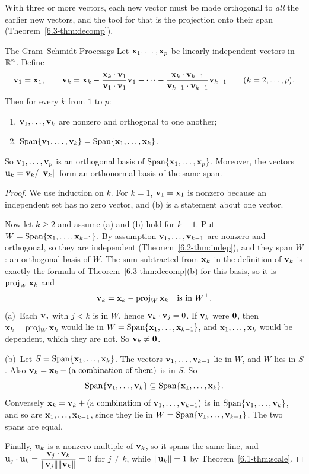 \documentclass[11pt]{article}
\begin{document}
With three or more vectors, each new vector must be made orthogonal to \emph{all} the earlier new vectors, and the tool for that is the projection onto their span (Theorem~\ref{6.3-thm:decomp}).

\begin{thm}{The Gram--Schmidt Process}{gs}
Let $\mathbf{x}_1,\dots,\mathbf{x}_p$ be linearly independent vectors in $\mathbb{R}^n$. Define
\[
\mathbf{v}_1=\mathbf{x}_1,\qquad \mathbf{v}_k=\mathbf{x}_k-\frac{\mathbf{x}_k\cdot\mathbf{v}_1}{\mathbf{v}_1\cdot\mathbf{v}_1}\mathbf{v}_1-\cdots-\frac{\mathbf{x}_k\cdot\mathbf{v}_{k-1}}{\mathbf{v}_{k-1}\cdot\mathbf{v}_{k-1}}\mathbf{v}_{k-1}\qquad(k=2,\dots,p).
\]
Then for every $k$ from $1$ to $p$:
\begin{enumerate}[label=(\alph*),itemsep=1pt]
  \item $\mathbf{v}_1,\dots,\mathbf{v}_k$ are nonzero and orthogonal to one another;
  \item $\operatorname{Span}\{\mathbf{v}_1,\dots,\mathbf{v}_k\}=\operatorname{Span}\{\mathbf{x}_1,\dots,\mathbf{x}_k\}$.
\end{enumerate}
So $\mathbf{v}_1,\dots,\mathbf{v}_p$ is an orthogonal basis of $\operatorname{Span}\{\mathbf{x}_1,\dots,\mathbf{x}_p\}$. Moreover, the vectors $\mathbf{u}_k=\mathbf{v}_k/\lVert\mathbf{v}_k\rVert$ form an orthonormal basis of the same span.
\end{thm}

\begin{proof}
We use induction on $k$. For $k=1$, $\mathbf{v}_1=\mathbf{x}_1$ is nonzero because an independent set has no zero vector, and (b) is a statement about one vector.

Now let $k\ge2$ and assume (a) and (b) hold for $k-1$. Put $W=\operatorname{Span}\{\mathbf{x}_1,\dots,\mathbf{x}_{k-1}\}$. By assumption $\mathbf{v}_1,\dots,\mathbf{v}_{k-1}$ are nonzero and orthogonal, so they are independent (Theorem~\ref{6.2-thm:indep}), and they span $W$: an orthogonal basis of $W$. The sum subtracted from $\mathbf{x}_k$ in the definition of $\mathbf{v}_k$ is exactly the formula of Theorem~\ref{6.3-thm:decomp}(b) for this basis, so it is $\operatorname{proj}_W\mathbf{x}_k$ and
\[
\mathbf{v}_k=\mathbf{x}_k-\operatorname{proj}_W\mathbf{x}_k\quad\text{is in }W^{\perp}.
\]
(a)~Each $\mathbf{v}_j$ with $j<k$ is in $W$, hence $\mathbf{v}_k\cdot\mathbf{v}_j=0$. If $\mathbf{v}_k$ were $\mathbf{0}$, then $\mathbf{x}_k=\operatorname{proj}_W\mathbf{x}_k$ would lie in $W=\operatorname{Span}\{\mathbf{x}_1,\dots,\mathbf{x}_{k-1}\}$, and $\mathbf{x}_1,\dots,\mathbf{x}_k$ would be dependent, which they are not. So $\mathbf{v}_k\neq\mathbf{0}$.

(b)~Let $S=\operatorname{Span}\{\mathbf{x}_1,\dots,\mathbf{x}_k\}$. The vectors $\mathbf{v}_1,\dots,\mathbf{v}_{k-1}$ lie in $W$, and $W$ lies in $S$. Also $\mathbf{v}_k=\mathbf{x}_k-(\text{a combination of them})$ is in $S$. So
\[
\operatorname{Span}\{\mathbf{v}_1,\dots,\mathbf{v}_k\}\subseteq\operatorname{Span}\{\mathbf{x}_1,\dots,\mathbf{x}_k\}.
\]
Conversely $\mathbf{x}_k=\mathbf{v}_k+(\text{a combination of }\mathbf{v}_1,\dots,\mathbf{v}_{k-1})$ is in $\operatorname{Span}\{\mathbf{v}_1,\dots,\mathbf{v}_k\}$, and so are $\mathbf{x}_1,\dots,\mathbf{x}_{k-1}$, since they lie in $W=\operatorname{Span}\{\mathbf{v}_1,\dots,\mathbf{v}_{k-1}\}$. The two spans are equal.

Finally, $\mathbf{u}_k$ is a nonzero multiple of $\mathbf{v}_k$, so it spans the same line, and $\mathbf{u}_j\cdot\mathbf{u}_k=\dfrac{\mathbf{v}_j\cdot\mathbf{v}_k}{\lVert\mathbf{v}_j\rVert\lVert\mathbf{v}_k\rVert}=0$ for $j\neq k$, while $\lVert\mathbf{u}_k\rVert=1$ by Theorem~\ref{6.1-thm:scale}.
\end{proof}
\end{document}
